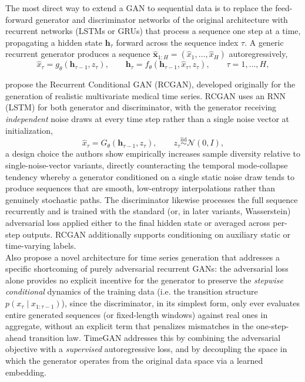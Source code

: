 The most direct way to extend a GAN to sequential data is to replace the feed-forward generator and discriminator networks of the original architecture with recurrent networks (LSTMs or GRUs) that process a sequence one step at a time,
propagating a hidden state $\mathbf{h}_\tau$ forward across the sequence index $\tau$. 
A generic recurrent generator produces a sequence $\hat{\mathbf{x}}_{1:H} = (\hat x_1, \dots, \hat x_H)$ autoregressively,
\begin{equation*}
\hat x_\tau = g_\theta\left(\mathbf{h}_{\tau-1}, z_\tau\right), \qquad \mathbf{h}_\tau = f_\theta\left(\mathbf{h}_{\tau-1}, \hat x_\tau, z_\tau\right), \qquad \tau = 1,\dots,H,
\end{equation*}

\cite{background:rcgan} propose the Recurrent Conditional GAN (RCGAN), developed originally for the generation of realistic multivariate medical time series. RCGAN uses an RNN (LSTM) for both generator and discriminator, with the generator receiving \emph{independent} noise draws at every time step rather than a single noise vector at initialization,
\begin{equation*}
\hat x_\tau = G_\theta\left(\mathbf{h}_{\tau-1}, z_\tau\right), \qquad z_\tau \stackrel{\text{iid}}{\sim} \mathcal{N}(0, I),
\end{equation*}
a design choice the authors show empirically increases sample diversity relative to single-noise-vector variants, directly counteracting the temporal mode-collapse tendency whereby a generator conditioned on a single static noise draw tends to produce sequences that are smooth, low-entropy interpolations rather than genuinely stochastic paths. The discriminator likewise processes the full sequence recurrently and is trained with the standard (or, in later variants, Wasserstein) adversarial loss applied either to the final hidden state or averaged across per-step outputs. RCGAN additionally supports conditioning on auxiliary static or time-varying labels.\\

Also \cite{background:timegan} propose a novel architecture for time series generation that addresses a specific shortcoming of purely adversarial recurrent GANs: 
the adversarial loss alone provides no explicit incentive for the 
generator to preserve the \emph{stepwise conditional} dynamics 
of the training data (i.e. the transition structure $p(x_\tau \mid x_{1:\tau-1})$), since the discriminator, 
in its simplest form, only ever evaluates entire generated sequences 
(or fixed-length windows) against real ones in aggregate, without an explicit term that penalizes mismatches in 
the one-step-ahead transition law. TimeGAN addresses this by combining the adversarial objective with a 
\emph{supervised} autoregressive loss, and by decoupling the 
space in which the generator operates from the original data space via a 
learned embedding.\\

